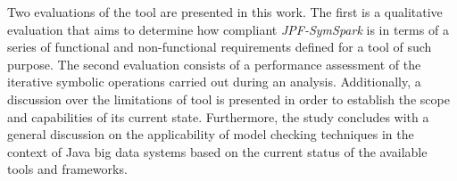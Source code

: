Two evaluations of the tool are presented in this work. The first is a qualitative evaluation that aims to determine how compliant \textit{JPF-SymSpark} is in terms of a series of functional and non-functional requirements defined for a tool of such purpose. The second evaluation consists of a performance assessment of the iterative symbolic operations carried out during an analysis. Additionally, a discussion over the limitations of tool is presented in order to establish the scope and capabilities of its current state. Furthermore, the study concludes with a general discussion on the applicability of model checking techniques in the context of Java big data systems based on the current status of the available tools and frameworks.